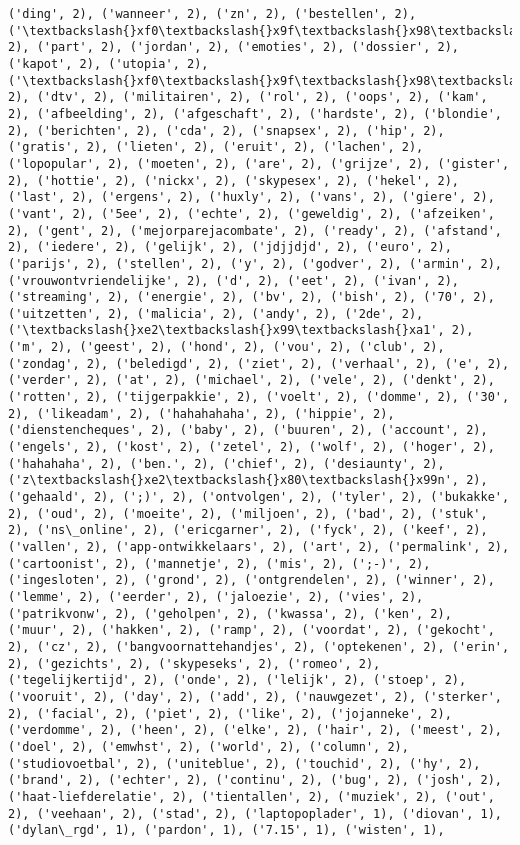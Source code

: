 \documentclass{article}
\begin{document}
\begin{Verbatim}[commandchars=\\\{\}]
('ding', 2), ('wanneer', 2), ('zn', 2), ('bestellen', 2), ('\textbackslash{}xf0\textbackslash{}x9f\textbackslash{}x98\textbackslash{}x9c', 2), ('part', 2), ('jordan', 2), ('emoties', 2), ('dossier', 2), ('kapot', 2), ('utopia', 2), ('\textbackslash{}xf0\textbackslash{}x9f\textbackslash{}x98\textbackslash{}xa1', 2), ('dtv', 2), ('militairen', 2), ('rol', 2), ('oops', 2), ('kam', 2), ('afbeelding', 2), ('afgeschaft', 2), ('hardste', 2), ('blondie', 2), ('berichten', 2), ('cda', 2), ('snapsex', 2), ('hip', 2), ('gratis', 2), ('lieten', 2), ('eruit', 2), ('lachen', 2), ('lopopular', 2), ('moeten', 2), ('are', 2), ('grijze', 2), ('gister', 2), ('hottie', 2), ('nickx', 2), ('skypesex', 2), ('hekel', 2), ('last', 2), ('ergens', 2), ('huxly', 2), ('vans', 2), ('giere', 2), ('vant', 2), ('5ee', 2), ('echte', 2), ('geweldig', 2), ('afzeiken', 2), ('gent', 2), ('mejorparejacombate', 2), ('ready', 2), ('afstand', 2), ('iedere', 2), ('gelijk', 2), ('jdjjdjd', 2), ('euro', 2), ('parijs', 2), ('stellen', 2), ('y', 2), ('godver', 2), ('armin', 2), ('vrouwontvriendelijke', 2), ('d', 2), ('eet', 2), ('ivan', 2), ('streaming', 2), ('energie', 2), ('bv', 2), ('bish', 2), ('70', 2), ('uitzetten', 2), ('malicia', 2), ('andy', 2), ('2de', 2), ('\textbackslash{}xe2\textbackslash{}x99\textbackslash{}xa1', 2), ('m', 2), ('geest', 2), ('hond', 2), ('vou', 2), ('club', 2), ('zondag', 2), ('beledigd', 2), ('ziet', 2), ('verhaal', 2), ('e', 2), ('verder', 2), ('at', 2), ('michael', 2), ('vele', 2), ('denkt', 2), ('rotten', 2), ('tijgerpakkie', 2), ('voelt', 2), ('domme', 2), ('30', 2), ('likeadam', 2), ('hahahahaha', 2), ('hippie', 2), ('dienstencheques', 2), ('baby', 2), ('buuren', 2), ('account', 2), ('engels', 2), ('kost', 2), ('zetel', 2), ('wolf', 2), ('hoger', 2), ('hahahaha', 2), ('ben.', 2), ('chief', 2), ('desiaunty', 2), ('z\textbackslash{}xe2\textbackslash{}x80\textbackslash{}x99n', 2), ('gehaald', 2), (';)', 2), ('ontvolgen', 2), ('tyler', 2), ('bukakke', 2), ('oud', 2), ('moeite', 2), ('miljoen', 2), ('bad', 2), ('stuk', 2), ('ns\_online', 2), ('ericgarner', 2), ('fyck', 2), ('keef', 2), ('vallen', 2), ('app-ontwikkelaars', 2), ('art', 2), ('permalink', 2), ('cartoonist', 2), ('mannetje', 2), ('mis', 2), (';-)', 2), ('ingesloten', 2), ('grond', 2), ('ontgrendelen', 2), ('winner', 2), ('lemme', 2), ('eerder', 2), ('jaloezie', 2), ('vies', 2), ('patrikvonw', 2), ('geholpen', 2), ('kwassa', 2), ('ken', 2), ('muur', 2), ('hakken', 2), ('ramp', 2), ('voordat', 2), ('gekocht', 2), ('cz', 2), ('bangvoornattehandjes', 2), ('optekenen', 2), ('erin', 2), ('gezichts', 2), ('skypeseks', 2), ('romeo', 2), ('tegelijkertijd', 2), ('onde', 2), ('lelijk', 2), ('stoep', 2), ('vooruit', 2), ('day', 2), ('add', 2), ('nauwgezet', 2), ('sterker', 2), ('facial', 2), ('piet', 2), ('like', 2), ('jojanneke', 2), ('verdomme', 2), ('heen', 2), ('elke', 2), ('hair', 2), ('meest', 2), ('doel', 2), ('emwhst', 2), ('world', 2), ('column', 2), ('studiovoetbal', 2), ('uniteblue', 2), ('touchid', 2), ('hy', 2), ('brand', 2), ('echter', 2), ('continu', 2), ('bug', 2), ('josh', 2), ('haat-liefderelatie', 2), ('tientallen', 2), ('muziek', 2), ('out', 2), ('veehaan', 2), ('stad', 2), ('laptopoplader', 1), ('diovan', 1), ('dylan\_rgd', 1), ('pardon', 1), ('7.15', 1), ('wisten', 1), 
\end{Verbatim}
\end{document}
